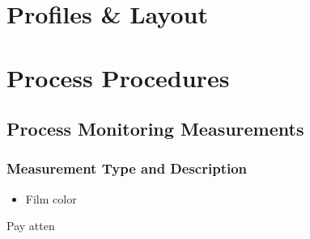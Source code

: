 \documentclass{article}
\begin{document}



\section{Profiles \& Layout}
\subsection{}
\subsection{}
\subsection{}
\section{Process Procedures}
\subsection{Process Monitoring Measurements}
\subsubsection{Measurement Type and Description}
\begin{itemize} 
\item Film color
\end{itemize}
Pay atten

\subsection{}
\subsection{}
\end{document}
